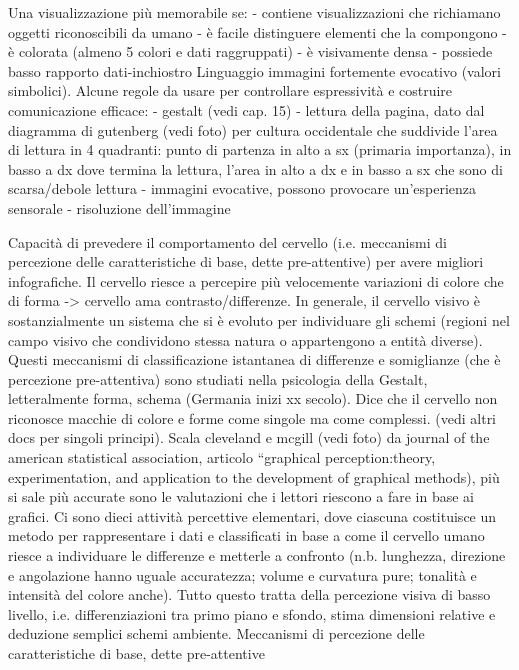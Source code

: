Una visualizzazione più memorabile se:
-	contiene visualizzazioni che richiamano oggetti riconoscibili da umano
-	è facile distinguere elementi che la compongono
-	è colorata (almeno 5 colori e dati raggruppati)
-	è visivamente densa
-	possiede basso rapporto dati-inchiostro
Linguaggio immagini fortemente evocativo (valori simbolici). Alcune regole da usare per controllare espressività e costruire comunicazione efficace:
-	gestalt (vedi cap. 15)
-	lettura della pagina, dato dal diagramma di gutenberg (vedi foto) per cultura occidentale che suddivide l'area di lettura in 4 quadranti: punto di partenza in alto a sx (primaria importanza), in basso a dx dove termina la lettura, l'area in alto a dx e in basso a sx che sono di scarsa/debole lettura
-	immagini evocative, possono provocare un'esperienza sensorale
-	risoluzione dell'immagine

Capacità di prevedere il comportamento del cervello (i.e. meccanismi di percezione delle caratteristiche di base, dette pre-attentive) per avere migliori infografiche.
Il cervello riesce a percepire più velocemente variazioni di colore che di forma -> cervello ama contrasto/differenze. In generale, il cervello visivo è sostanzialmente un sistema che si è evoluto per individuare gli schemi (regioni nel campo visivo che condividono stessa natura o appartengono a entità diverse). Questi meccanismi di classificazione istantanea di differenze e somiglianze (che è percezione pre-attentiva) sono studiati nella psicologia della Gestalt, letteralmente forma, schema (Germania inizi xx secolo). Dice che il cervello non riconosce macchie di colore e forme come singole ma come complessi.
(vedi altri docs per singoli principi).
Scala cleveland e mcgill (vedi foto) da journal of the american statistical association, articolo “graphical perception:theory, experimentation, and application to the development of graphical methods), più si sale più accurate sono le valutazioni che i lettori riescono a fare in base ai grafici. Ci sono dieci attività percettive elementari, dove ciascuna costituisce un metodo per rappresentare i dati e classificati in base a come il cervello umano riesce a individuare le differenze e metterle a confronto (n.b. lunghezza, direzione e angolazione hanno uguale accuratezza; volume e curvatura pure; tonalità e intensità del colore anche).
Tutto questo tratta della percezione visiva di basso livello, i.e. differenziazioni tra primo piano e sfondo, stima dimensioni relative e deduzione semplici schemi ambiente.
Meccanismi di percezione delle caratteristiche di base, dette pre-attentive

